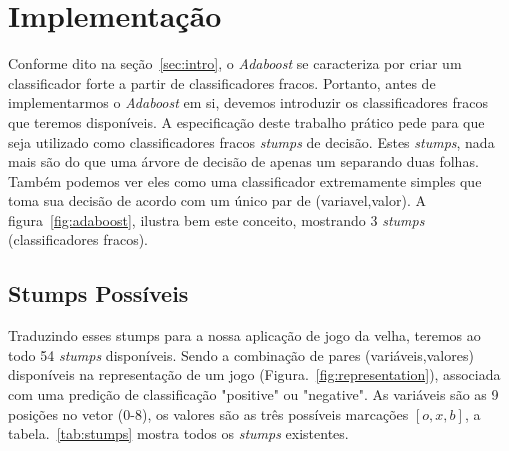 \section{Implementação}
Conforme dito na seção~\ref{sec:intro}, o \emph{Adaboost} se caracteriza por criar um classificador forte a partir de classificadores fracos. Portanto, antes de implementarmos o \emph{Adaboost} em si, devemos introduzir os classificadores fracos que teremos disponíveis.  A especificação deste trabalho prático pede para que seja utilizado como classificadores fracos \emph{stumps} de decisão. Estes \emph{stumps}, nada mais são do que  uma árvore de decisão de apenas um separando duas folhas. Também podemos ver eles como uma classificador extremamente simples que toma sua decisão de acordo com um único par de  (variavel,valor). A figura~\ref{fig:adaboost}, ilustra bem este conceito, mostrando 3 \emph{stumps} (classificadores fracos).

\subsection{Stumps Possíveis}
Traduzindo esses stumps para a nossa aplicação de jogo da velha, teremos ao todo 54 \emph{stumps} disponíveis. Sendo a combinação de pares (variáveis,valores) disponíveis na representação de um jogo (Figura.~\ref{fig:representation}), associada com uma predição de classificação "positive" ou "negative". As variáveis são as 9 posições no vetor (0-8), os valores são as três possíveis marcações $[o,x,b]$, a tabela.~\ref{tab:stumps} mostra todos os \emph{stumps} existentes.

